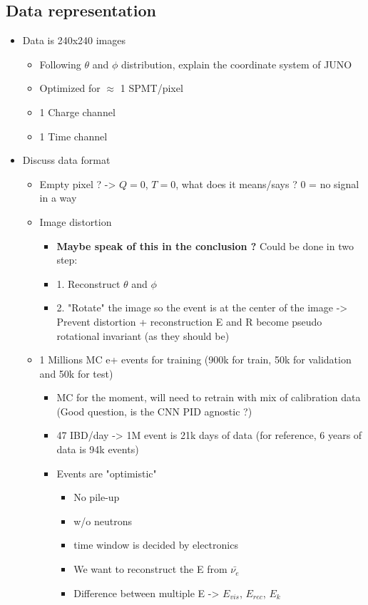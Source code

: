 \subsection{Data representation}
\label{sec:jcnn:data}
\begin{itemize}
  \item Data is 240x240 images
    \begin{itemize}
      \item Following $\theta$ and $\phi$ distribution, explain the coordinate system of JUNO
      \item Optimized for $\approx$ 1 SPMT/pixel
      \item 1 Charge channel
      \item 1 Time channel
    \end{itemize}
  \item Discuss data format
    \begin{itemize}
      \item Empty pixel ? -> $Q = 0$, $T = 0$, what does it means/says ? 0 = no signal in a way
      \item Image distortion
        \begin{itemize}
          \item \textbf{Maybe speak of this in the conclusion ?} Could be done in two step:
          \item 1. Reconstruct $\theta$ and $\phi$
          \item 2. "Rotate" the image so the event is at the center of the image -> Prevent distortion + reconstruction E and R become pseudo rotational invariant (as they should be)
        \end{itemize}
      \item 1 Millions MC e+ events for training (900k for train, 50k for validation and 50k for test)
        \begin{itemize}
          \item MC for the moment, will need to retrain with mix of calibration data (Good question, is the CNN PID agnostic ?)
          \item 47 IBD/day -> 1M event is 21k days of data (for reference, 6 years of data is 94k events)
          \item Events are "optimistic"
            \begin{itemize}
              \item No pile-up
              \item w/o neutrons
              \item time window is decided by electronics
              \item We want to reconstruct the E from $\bar{\nu_e}$
              \item Difference between multiple E -> $E_{vis}$, $E_{rec}$, $E_k$
            \end{itemize}
        \end{itemize}
    \end{itemize}
\end{itemize}

